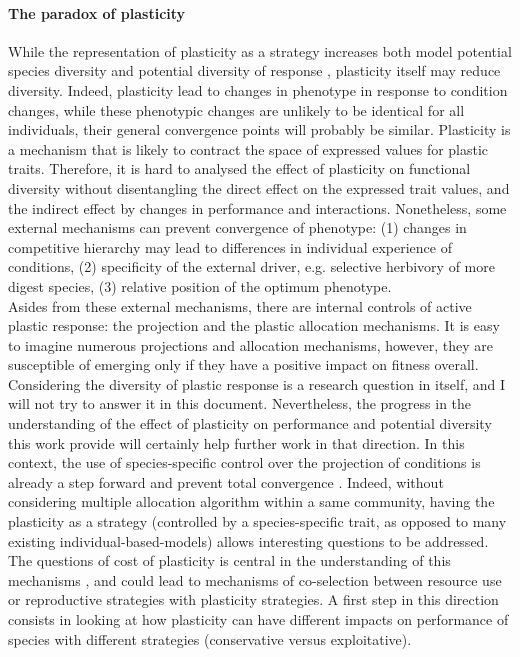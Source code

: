 \paragraph{The paradox of plasticity}

While the representation of plasticity as a strategy increases both model potential species diversity and potential diversity of response \parencite{ ryser_consequences_2000, kichenin_contrasting_2013}, plasticity itself may reduce diversity. Indeed, plasticity lead to changes in phenotype in response to condition changes, while these phenotypic changes are unlikely to be identical for all individuals, their general convergence points will probably be similar. Plasticity is a mechanism that is likely to contract the space of expressed values for plastic traits. Therefore, it is hard to analysed the effect of plasticity on functional diversity without disentangling the direct effect on the expressed trait values, and the indirect effect by changes in performance and interactions. Nonetheless, some external mechanisms  can prevent convergence of phenotype: (1) changes in competitive hierarchy may lead to differences in individual experience of conditions, (2) specificity of the external driver, e.g. selective herbivory of more digest species, (3) relative position of the optimum phenotype. \\
Asides from these external mechanisms, there are internal controls of active plastic response: the projection and the plastic allocation mechanisms. It is easy to imagine numerous projections and allocation mechanisms, however, they are susceptible of emerging only if they have a positive impact on fitness overall. Considering the diversity of plastic response is a research question in itself, and I will not try to answer it in this document. Nevertheless, the progress in the understanding of the effect of plasticity on performance and potential diversity this work provide will certainly help further work in that direction. In this context, the use of species-specific control over the projection of conditions is already a step forward and prevent total convergence . Indeed, without considering multiple allocation algorithm within a same community, having the plasticity as a strategy \parencite{bradshaw_unravelling_2006} (controlled by a species-specific trait, as opposed to many existing individual-based-models) allows interesting questions to be addressed. The questions of cost of plasticity is central in the understanding of this mechanisms \parencite{dewitt_costs_1998, auld_re-evaluating_2009}, and could lead to mechanisms of co-selection between resource use or reproductive strategies with plasticity strategies. A first step in this direction consists in looking at how plasticity can have different impacts on performance of species with different strategies (conservative versus exploitative).



